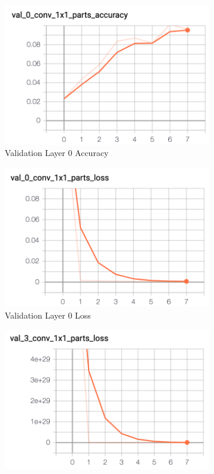 \documentclass[11pt, letterpaper]{article}
\begin{document}
\begin{figure}[h]
    \centering
    \begin{subfigure}{0.4\textwidth}
        \includegraphics[width=0.8\linewidth]{val_layer_0_acc.png}
        \caption{Validation Layer 0 Accuracy}
    \end{subfigure}
    \begin{subfigure}{0.4\textwidth}
        \includegraphics[width=0.8\linewidth]{val_layer_0_loss.png}
        \caption{Validation Layer 0 Loss}
    \end{subfigure}
    \begin{subfigure}{0.4\textwidth}
        \includegraphics[width=0.8\linewidth]{val_layer_3_acc.png}

\end{subfigure}
\end{figure}
\end{document}
